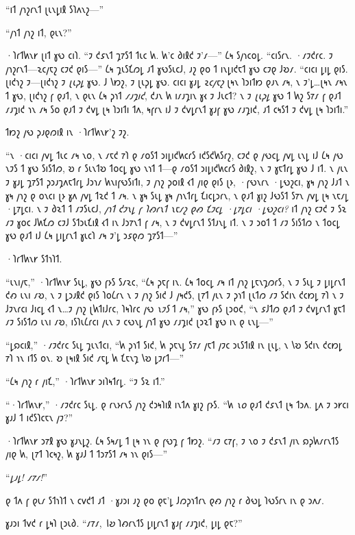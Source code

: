 “𐑦𐑑 𐑢𐑪𐑟𐑩𐑯𐑑 𐑚𐑧𐑯𐑛𐑦𐑙 𐑕𐑐𐑵𐑯𐑟—”

“𐑢𐑪𐑑 𐑢𐑪𐑟 𐑦𐑑, 𐑞𐑧𐑯?”

·𐑐𐑩𐑑𐑿𐑯𐑾 𐑚𐑦𐑑 𐑣𐑻 𐑤𐑦𐑐. “𐑲 𐑒𐑭𐑯𐑑 𐑡𐑳𐑕𐑑 𐑑𐑧𐑤 𐑿. 𐑿'𐑤 𐑔𐑦𐑙𐑒 𐑲'𐑥—” 𐑖𐑰 𐑕𐑢𐑪𐑤𐑴𐑛. “𐑤𐑦𐑕𐑩𐑯. ·𐑥𐑲𐑒𐑩𐑤. 𐑲 𐑢𐑪𐑟𐑩𐑯𐑑—𐑷𐑤𐑢𐑱𐑟 𐑤𐑲𐑒 𐑞𐑦𐑕—” 𐑖𐑰 𐑡𐑧𐑕𐑗𐑼𐑛 𐑨𐑑 𐑣𐑻𐑕𐑧𐑤𐑓, 𐑨𐑟 𐑞𐑴 𐑑 𐑦𐑯𐑛𐑦𐑒𐑱𐑑 𐑣𐑻 𐑤𐑲𐑞 𐑓𐑹𐑥. “𐑤𐑦𐑤𐑦 𐑛𐑦𐑛 𐑞𐑦𐑕. 𐑚𐑦𐑒𐑪𐑟 𐑲—𐑚𐑦𐑒𐑪𐑟 𐑲 \emph{𐑚𐑧𐑜𐑛} 𐑣𐑻. 𐑓 𐑘𐑽𐑟, 𐑲 𐑚𐑧𐑜𐑛 𐑣𐑻. 𐑤𐑦𐑤𐑦 𐑣𐑨𐑛 \emph{𐑷𐑤𐑢𐑱𐑟} 𐑚𐑰𐑯 𐑐𐑮𐑦𐑑𐑽 𐑞𐑨𐑯 𐑥𐑰, 𐑯 𐑲'𐑛…𐑚𐑰𐑯 𐑥𐑰𐑯 𐑑 𐑣𐑻, 𐑚𐑦𐑒𐑪𐑟 𐑝 𐑞𐑨𐑑, 𐑯 𐑞𐑧𐑯 𐑖𐑰 𐑜𐑪𐑑 \emph{𐑥𐑨𐑡𐑦𐑒}, 𐑒𐑨𐑯 𐑿 𐑦𐑥𐑨𐑡𐑦𐑯 𐑣𐑬 𐑲 𐑓𐑧𐑤𐑑? 𐑯 𐑲 \emph{𐑚𐑧𐑜𐑛} 𐑣𐑻 𐑑 𐑿𐑟 𐑕𐑳𐑥 𐑝 𐑞𐑨𐑑 𐑥𐑨𐑡𐑦𐑒 𐑪𐑯 𐑥𐑰 𐑕𐑴 𐑞𐑨𐑑 𐑲 𐑒𐑫𐑛 𐑚𐑰 𐑐𐑮𐑦𐑑𐑦 𐑑𐑵, 𐑰𐑝𐑩𐑯 𐑦𐑓 𐑲 𐑒𐑫𐑛𐑩𐑯𐑑 𐑣𐑨𐑝 𐑣𐑻 𐑥𐑨𐑡𐑦𐑒, 𐑨𐑑 𐑤𐑰𐑕𐑑 𐑲 𐑒𐑫𐑛 𐑚𐑰 𐑐𐑮𐑦𐑑𐑦.”

𐑑𐑽𐑟 𐑢𐑻 𐑜𐑨𐑞𐑼𐑦𐑙 𐑦𐑯 ·𐑐𐑩𐑑𐑿𐑯𐑾'𐑟 𐑲𐑟.

“𐑯 ·𐑤𐑦𐑤𐑦 𐑢𐑫𐑛 𐑑𐑧𐑤 𐑥𐑰 𐑯𐑴, 𐑯 𐑥𐑱𐑒 𐑳𐑐 𐑞 𐑥𐑴𐑕𐑑 𐑮𐑦𐑛𐑦𐑒𐑿𐑤𐑩𐑕 𐑦𐑒𐑕𐑒𐑿𐑕𐑩𐑟, 𐑤𐑲𐑒 𐑞 𐑢𐑻𐑤𐑛 𐑢𐑫𐑛 𐑧𐑯𐑛 𐑦𐑓 𐑖𐑰 𐑢𐑻 𐑯𐑲𐑕 𐑑 𐑣𐑻 𐑕𐑦𐑕𐑑𐑼, 𐑹 𐑩 𐑕𐑧𐑯𐑑𐑹 𐑑𐑴𐑤𐑛 𐑣𐑻 𐑯𐑪𐑑 𐑑—𐑞 𐑥𐑴𐑕𐑑 𐑮𐑦𐑛𐑦𐑒𐑿𐑤𐑩𐑕 𐑔𐑦𐑙𐑟, 𐑯 𐑲 𐑣𐑱𐑑𐑩𐑛 𐑣𐑻 𐑓 𐑦𐑑. 𐑯 𐑢𐑧𐑯 𐑲 𐑣𐑨𐑛 𐑡𐑳𐑕𐑑 𐑜𐑮𐑨𐑡𐑵𐑱𐑑𐑩𐑛 𐑓𐑮𐑪𐑥 𐑿𐑯𐑦𐑝𐑻𐑕𐑦𐑑𐑦, 𐑲 𐑢𐑪𐑟 𐑜𐑴𐑦𐑙 𐑬𐑑 𐑢𐑦𐑞 𐑞𐑦𐑕 𐑚𐑶, ·𐑝𐑻𐑯𐑩𐑯 ·𐑛𐑻𐑟𐑤𐑦, 𐑣𐑰 𐑢𐑪𐑟 𐑓𐑨𐑑 𐑯 𐑣𐑰 𐑢𐑪𐑟 𐑞 𐑴𐑯𐑤𐑦 𐑚𐑶 𐑣𐑵 𐑢𐑫𐑛 𐑑𐑷𐑒 𐑑 𐑥𐑰. 𐑯 𐑣𐑰 𐑕𐑧𐑛 𐑣𐑰 𐑢𐑪𐑯𐑑𐑩𐑛 𐑗𐑦𐑤𐑛𐑮𐑩𐑯, 𐑯 𐑞𐑨𐑑 𐑣𐑦𐑟 𐑓𐑻𐑕𐑑 𐑕𐑳𐑯 𐑢𐑫𐑛 𐑚𐑰 𐑯𐑱𐑥𐑛 ·𐑛𐑳𐑛𐑤𐑦. 𐑯 𐑲 𐑔𐑷𐑑 𐑑 𐑥𐑲𐑕𐑧𐑤𐑓, \emph{𐑢𐑪𐑑 𐑒𐑲𐑯𐑛 𐑝 𐑐𐑺𐑩𐑯𐑑 𐑯𐑱𐑥𐑟 𐑞𐑺 𐑗𐑲𐑤𐑛 ·𐑛𐑳𐑛𐑤𐑦 ·𐑛𐑻𐑟𐑤𐑦?} 𐑦𐑑 𐑢𐑪𐑟 𐑤𐑲𐑒 𐑲 𐑕𐑷 𐑥𐑲 𐑣𐑴𐑤 𐑓𐑿𐑗𐑼 𐑤𐑲𐑓 𐑕𐑑𐑮𐑧𐑗𐑦𐑙 𐑬𐑑 𐑦𐑯 𐑓𐑮𐑳𐑯𐑑 𐑝 𐑥𐑰, 𐑯 𐑲 𐑒𐑫𐑛𐑩𐑯𐑑 𐑕𐑑𐑨𐑯𐑛 𐑦𐑑. 𐑯 𐑲 𐑮𐑴𐑑 𐑑 𐑥𐑲 𐑕𐑦𐑕𐑑𐑼 𐑯 𐑑𐑴𐑤𐑛 𐑣𐑻 𐑞𐑨𐑑 𐑦𐑓 𐑖𐑰 𐑛𐑦𐑛𐑩𐑯𐑑 𐑣𐑧𐑤𐑐 𐑥𐑰 𐑲'𐑛 𐑮𐑭𐑞𐑼 𐑡𐑳𐑕𐑑—”

·𐑐𐑩𐑑𐑿𐑯𐑾 𐑕𐑑𐑪𐑐𐑑.

“𐑧𐑯𐑦𐑢𐑱,” ·𐑐𐑩𐑑𐑿𐑯𐑾 𐑕𐑧𐑛, 𐑣𐑻 𐑝𐑶𐑕 𐑕𐑥𐑷𐑤, “𐑖𐑰 𐑜𐑱𐑝 𐑦𐑯. 𐑖𐑰 𐑑𐑴𐑤𐑛 𐑥𐑰 𐑦𐑑 𐑢𐑪𐑟 𐑛𐑱𐑯𐑡𐑼𐑩𐑕, 𐑯 𐑲 𐑕𐑧𐑛 𐑲 𐑛𐑦𐑛𐑩𐑯𐑑 𐑒𐑺 𐑧𐑯𐑦 𐑥𐑹, 𐑯 𐑲 𐑛𐑮𐑨𐑙𐑒 𐑞𐑦𐑕 𐑐𐑴𐑖𐑩𐑯 𐑯 𐑲 𐑢𐑪𐑟 𐑕𐑦𐑒 𐑓 𐑢𐑰𐑒𐑕, 𐑚𐑳𐑑 𐑢𐑧𐑯 𐑲 𐑜𐑪𐑑 𐑚𐑧𐑑𐑼 𐑥𐑲 𐑕𐑒𐑦𐑯 𐑒𐑤𐑽𐑛 𐑳𐑐 𐑯 𐑲 𐑓𐑲𐑯𐑩𐑤𐑦 𐑓𐑦𐑤𐑛 𐑬𐑑 𐑯…𐑲 𐑢𐑪𐑟 𐑚𐑿𐑑𐑦𐑓𐑩𐑤, 𐑐𐑰𐑐𐑩𐑤 𐑢𐑻 \emph{𐑯𐑲𐑕} 𐑑 𐑥𐑰,” 𐑣𐑻 𐑝𐑶𐑕 𐑚𐑮𐑴𐑒, “𐑯 𐑭𐑓𐑑𐑼 𐑞𐑨𐑑 𐑲 𐑒𐑫𐑛𐑩𐑯𐑑 𐑣𐑱𐑑 𐑥𐑲 𐑕𐑦𐑕𐑑𐑼 𐑧𐑯𐑦 𐑥𐑹, 𐑦𐑕𐑐𐑧𐑖𐑩𐑤𐑦 𐑢𐑧𐑯 𐑲 𐑤𐑻𐑯𐑛 𐑢𐑪𐑑 𐑣𐑻 𐑥𐑨𐑡𐑦𐑒 𐑚𐑮𐑷𐑑 𐑣𐑻 𐑦𐑯 𐑞 𐑧𐑯𐑛—”

“𐑛𐑸𐑤𐑦𐑙,” ·𐑥𐑲𐑒𐑩𐑤 𐑕𐑧𐑛 𐑡𐑧𐑯𐑑𐑤𐑦, “𐑿 𐑜𐑪𐑑 𐑕𐑦𐑒, 𐑿 𐑜𐑱𐑯𐑛 𐑕𐑳𐑥 𐑢𐑱𐑑 𐑢𐑲𐑤 𐑮𐑧𐑕𐑑𐑦𐑙 𐑦𐑯 𐑚𐑧𐑛, 𐑯 𐑘𐑹 𐑕𐑒𐑦𐑯 𐑒𐑤𐑽𐑛 𐑳𐑐 𐑪𐑯 𐑦𐑑𐑕 𐑴𐑯. 𐑹 𐑚𐑰𐑦𐑙 𐑕𐑦𐑒 𐑥𐑱𐑛 𐑿 𐑗𐑱𐑯𐑡 𐑘𐑹 𐑛𐑲𐑩𐑑—”

“𐑖𐑰 𐑢𐑪𐑟 𐑩 𐑢𐑦𐑗,” ·𐑐𐑩𐑑𐑿𐑯𐑾 𐑮𐑦𐑐𐑰𐑑𐑩𐑛. “𐑲 𐑕𐑷 𐑦𐑑.”

“·𐑐𐑩𐑑𐑿𐑯𐑾,” ·𐑥𐑲𐑒𐑩𐑤 𐑕𐑧𐑛. 𐑞 𐑩𐑯𐑶𐑩𐑯𐑕 𐑢𐑪𐑟 𐑒𐑮𐑰𐑐𐑦𐑙 𐑦𐑯𐑑𐑵 𐑣𐑦𐑟 𐑝𐑶𐑕. “𐑿 \emph{𐑯𐑴} 𐑞𐑨𐑑 𐑒𐑭𐑯𐑑 𐑚𐑰 𐑑𐑮𐑵. 𐑛𐑵 𐑲 𐑮𐑾𐑤𐑦 𐑣𐑨𐑓 𐑑 𐑦𐑒𐑕𐑐𐑤𐑱𐑯 𐑢𐑲?”

·𐑐𐑩𐑑𐑿𐑯𐑾 𐑮𐑳𐑙 𐑣𐑻 𐑣𐑨𐑯𐑛𐑟. 𐑖𐑰 𐑕𐑰𐑥𐑛 𐑑 𐑚𐑰 𐑪𐑯 𐑞 𐑝𐑻𐑡 𐑝 𐑑𐑽𐑟. “𐑥𐑲 𐑤𐑳𐑝, 𐑲 𐑯𐑴 𐑲 𐑒𐑭𐑯𐑑 𐑢𐑦𐑯 𐑸𐑜𐑿𐑥𐑩𐑯𐑑𐑕 𐑢𐑦𐑞 𐑿, 𐑚𐑳𐑑 𐑐𐑤𐑰𐑟, 𐑿 𐑣𐑨𐑓 𐑑 𐑑𐑮𐑳𐑕𐑑 𐑥𐑰 𐑪𐑯 𐑞𐑦𐑕—”

“\emph{𐑛𐑨𐑛! 𐑥𐑳𐑥!}”

𐑞 𐑑𐑵 𐑝 𐑞𐑧𐑥 𐑕𐑑𐑪𐑐𐑑 𐑯 𐑤𐑫𐑒𐑑 𐑨𐑑 ·𐑣𐑨𐑮𐑦 𐑨𐑟 𐑞𐑴 𐑞𐑱'𐑛 𐑓𐑼𐑜𐑪𐑑𐑩𐑯 𐑞𐑺 𐑢𐑪𐑟 𐑩 𐑔𐑻𐑛 𐑐𐑻𐑕𐑩𐑯 𐑦𐑯 𐑞 𐑮𐑵𐑥.

𐑣𐑨𐑮𐑦 𐑑𐑫𐑒 𐑩 𐑛𐑰𐑐 𐑚𐑮𐑧𐑔. “𐑥𐑳𐑥, \emph{𐑘𐑹} 𐑐𐑺𐑩𐑯𐑑𐑕 𐑛𐑦𐑛𐑩𐑯𐑑 𐑣𐑨𐑝 𐑥𐑨𐑡𐑦𐑒, 𐑛𐑦𐑛 𐑞𐑱?”

